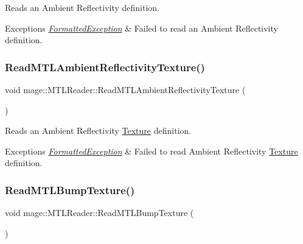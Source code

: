 Reads an Ambient Reflectivity definition.


\begin{DoxyExceptions}{Exceptions}
{\em \hyperlink{structmage_1_1_formatted_exception}{Formatted\+Exception}} & Failed to read an Ambient Reflectivity definition. \\
\hline
\end{DoxyExceptions}
\hypertarget{classmage_1_1_m_t_l_reader_ae5fa12979b84a5880bf560b43d495305}{}\label{classmage_1_1_m_t_l_reader_ae5fa12979b84a5880bf560b43d495305} 
\subsubsection{\texorpdfstring{Read\+M\+T\+L\+Ambient\+Reflectivity\+Texture()}{ReadMTLAmbientReflectivityTexture()}}
{\footnotesize\ttfamily void mage\+::\+M\+T\+L\+Reader\+::\+Read\+M\+T\+L\+Ambient\+Reflectivity\+Texture (\begin{DoxyParamCaption}{ }\end{DoxyParamCaption})\hspace{0.3cm}{\ttfamily [private]}}

Reads an Ambient Reflectivity \hyperlink{classmage_1_1_texture}{Texture} definition.


\begin{DoxyExceptions}{Exceptions}
{\em \hyperlink{structmage_1_1_formatted_exception}{Formatted\+Exception}} & Failed to read Ambient Reflectivity \hyperlink{classmage_1_1_texture}{Texture} definition. \\
\hline
\end{DoxyExceptions}
\hypertarget{classmage_1_1_m_t_l_reader_acf7aacf933f842d3e14af92d161acd5b}{}\label{classmage_1_1_m_t_l_reader_acf7aacf933f842d3e14af92d161acd5b} 
\subsubsection{\texorpdfstring{Read\+M\+T\+L\+Bump\+Texture()}{ReadMTLBumpTexture()}}
{\footnotesize\ttfamily void mage\+::\+M\+T\+L\+Reader\+::\+Read\+M\+T\+L\+Bump\+Texture (\begin{DoxyParamCaption}{ }\end{DoxyParamCaption})\hspace{0.3cm}{\ttfamily [private]}}


